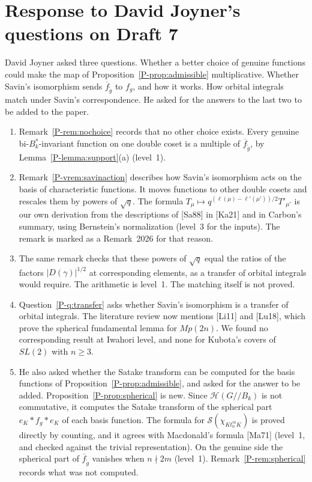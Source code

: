 \documentclass[12pt,letterpaper]{amsart}
\newcommand{\cH}{\mathcal{H}}
\begin{document}
\section{Response to David Joyner's questions on Draft 7}

David Joyner asked three questions. Whether a better choice of genuine
functions could make the map of Proposition~\ref{P-prop:admissible}
multiplicative. Whether Savin's isomorphism sends $\overline f_{\tilde
g}$ to $f_g$, and how it works. How orbital integrals match under
Savin's correspondence. He asked for the answers to the last two to be
added to the paper.

\begin{enumerate}[leftmargin=1.5em]
\item Remark~\ref{P-rem:nochoice} records that no other choice exists.
Every genuine bi-$B_k^*$-invariant function on one double coset is a
multiple of $\overline f_{\tilde g}$, by Lemma~\ref{P-lemma:support}(a)
(level~1).
\item Remark~\ref{P-vrem:savinaction} describes how Savin's isomorphism
acts on the basis of characteristic functions. It moves functions to
other double cosets and rescales them by powers of $\sqrt q$. The
formula $T_\mu\mapsto q^{(\ell(\mu)-\ell'(\mu'))/2}T'_{\mu'}$ is our own
derivation from the descriptions of [Sa88] in [Ka21] and in Carbon's
summary, using Bernstein's normalization (level~3 for the inputs). The
remark is marked as a Remark~2026 for that reason.
\item The same remark checks that these powers of $\sqrt q$ equal the
ratios of the factors $|D(\gamma)|^{1/2}$ at corresponding elements, as
a transfer of orbital integrals would require. The arithmetic is
level~1. The matching itself is not proved.
\item Question~\ref{P-q:transfer} asks whether Savin's isomorphism is a
transfer of orbital integrals. The literature review now mentions
[Li11] and [Lu18], which prove the spherical fundamental lemma for
$Mp(2n)$. We found no corresponding result at Iwahori level, and none
for Kubota's covers of $SL(2)$ with $n\geq 3$.
\item He also asked whether the Satake transform can be computed for
the basis functions of Proposition~\ref{P-prop:admissible}, and asked
for the answer to be added. Proposition~\ref{P-prop:spherical} is new.
Since $\cH(G/\!/B_k)$ is not commutative, it computes the Satake
transform of the spherical part $e_K*f_g*e_K$ of each basis function.
The formula for $\mathcal S(\chi_{Kt_0^mK})$ is proved directly by
counting, and it agrees with Macdonald's formula [Ma71] (level~1, and
checked against the trivial representation). On the genuine side the
spherical part of $\overline f_{\tilde g}$ vanishes when $n\nmid 2m$
(level~1). Remark~\ref{P-rem:spherical} records what was not computed.
\end{enumerate}
\end{document}
